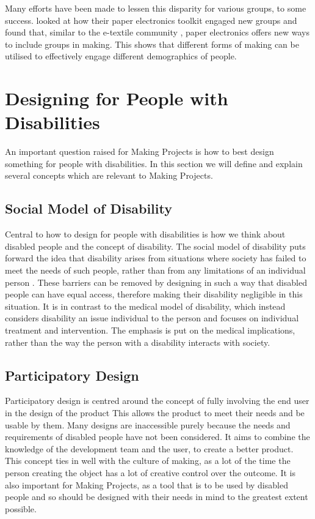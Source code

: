 \documentclass{l4proj}
\begin{document}
Many efforts have been made to lessen this disparity for various groups, to some success. \cite{Qi2018} looked at how their paper electronics toolkit engaged new groups and found that, similar to the e-textile community \citep{Bue2010}, paper electronics offers new ways to include groups in making. This shows that different forms of making can be utilised to effectively engage different demographics of people.


\section{Designing for People with Disabilities}
An important question raised for Making Projects is how to best design something for people with disabilities. In this section we will define and explain several concepts which are relevant to Making Projects.

\subsection{Social Model of Disability}
Central to how to design for people with disabilities is how we think about disabled people and the concept of disability. The social model of disability puts forward the idea that disability arises from situations where society has failed to meet the needs of such people, rather than from any limitations of an individual person \citep{Oli1990}. These barriers can be removed by designing in such a way that disabled people can have equal access, therefore making their disability negligible in this situation. It is in contrast to the medical model of disability, which instead considers disability an issue individual to the person and focuses on individual treatment and intervention. The emphasis is put on the medical implications, rather than the way the person with a disability interacts with society. 

\subsection{Participatory Design}
Participatory design is centred around the concept of fully involving the end user in the design of the product \citep{Per2015} This allows the product to meet their needs and be usable by them. Many designs are inaccessible purely because the needs and requirements of disabled people have not been considered. It aims to combine the knowledge of the development team and the user, to create a better product. This concept ties in well with the culture of making, as a lot of the time the person creating the object has a lot of creative control over the outcome. It is also important for Making Projects, as a tool that is to be used by disabled people and so should be designed with their needs in mind to the greatest extent possible. 
\end{document}
